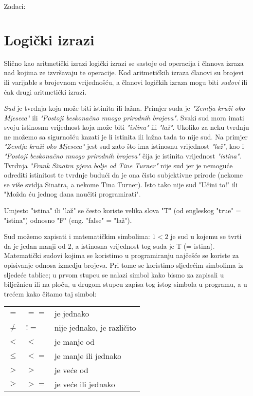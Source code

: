 Zadaci:

\section{Logi\v{c}ki izrazi}

Sli\v{c}no kao aritmeti\v{c}ki izrazi logi\v{c}ki izrazi se sastoje od
operacija i \v{c}lanova izraza nad kojima ze izvr\v{s}avaju te operacije.
Kod aritmeti\v{c}kih izraza \v{c}lanovi su brojevi ili varijable s
brojevnom vrijedno\v{s}\'{c}u, a \v{c}lanovi logi\v{c}kih izraza mogu biti
\emph{sudovi} ili \v{c}ak drugi aritmeti\v{c}ki izrazi.

\emph{Sud} je tvrdnja koja mo\v{z}e biti istinita ili la\v{z}na. Primjer
suda je \emph{"Zemlja kru\v{z}i oko Mjeseca"} ili \emph{"Postoji
beskona\v{c}no mnogo prirodnih brojeva"}.  Svaki sud mora imati svoju
istinosnu vrijednost koja mo\v{z}e biti \emph{"istina"} ili \emph{"la\v{z}"}.
Ukoliko za neku tvrdnju ne mo\v{z}emo sa sigurno\v{s}\'{c}u kazati je li
istinita ili la\v{z}na tada to nije sud. Na primjer \emph{"Zemlja
kru\v{z}i oko Mjeseca"} jest sud zato \v{s}to ima istinosnu vrijednost
\emph{"la\v{z}"}, kao i \emph{"Postoji beskona\v{c}no mnogo prirodnih
brojeva"} \v{c}ija je istinita vrijednost \emph{"istina"}.  Tvrdnja
\emph{"Frank Sinatra pjeva bolje od Tine Turner"} nije sud jer je
nemogu\'{c}e odrediti istinitost te tvrdnje budu\'{c}i da je ona \v{c}isto
subjektivne prirode (nekome se vi\v{s}e svidja Sinatra, a nekome Tina
Turner). Isto tako nije sud "U\v{c}ini to!" ili "Mo\v{z}da \'{c}u jednog
dana nau\v{c}iti programirati".

Umjesto "istina" ili "la\v{z}" se \v{c}esto koriste velika slova "T" (od
engleskog "true" = "istina") odnosno "F" (eng. "false" = "la\v{z}").

Sud mo\v{z}emo zapisati i matemati\v{c}kim simbolima: $1<2$ je sud u
kojemu se tvrti da je jedan manji od 2, a istinosna vrijednost tog
suda je T (= istina). Matemati\v{c}ki sudovi kojima se koristimo u
programiranju naj\v{c}e\v{s}\'{c}e se koriste za opisivanje odnosa izmedju
brojeva. Pri tome se koristimo sljede\'{c}im simbolima iz sljede\'{c}e tablice;
u prvom stupcu se nalazi simbol kako bismo za zapisali u bilje\v{z}nicu
ili na plo\v{c}u, u drugom stupcu zapisa tog istog simbola u programu,
a u tre\'{c}em kako \v{c}itamo taj simbol:

\begin{tabular}{lll}
	$=$ & $==$ & je jednako \\
	$\neq$ & $!=$ & nije jednako, je razli\v{c}ito \\
	$<$ & $<$ & je manje od \\
	$\leq$ & $<=$ & je manje ili jednako \\
	$>$ & $>$ & je ve\'{c}e od \\
	$\geq$ & $>=$ & je ve\'{c}e ili jednako
\end{tabular}

